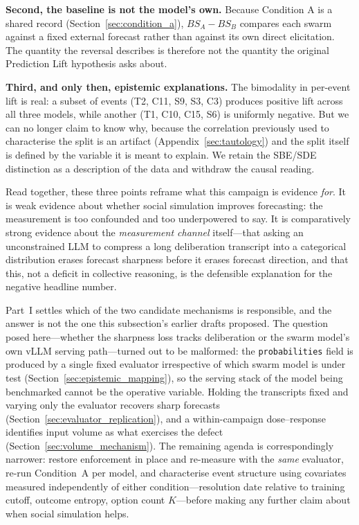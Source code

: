 \documentclass[11pt,journal,onecolumn]{IEEEtran}
\begin{document}
\textbf{Second, the baseline is not the model's own.} Because Condition A is a shared record (Section~\ref{sec:condition_a}), $BS_A - BS_B$ compares each swarm against a fixed external forecast rather than against its own direct elicitation. The quantity the reversal describes is therefore not the quantity the original Prediction Lift hypothesis asks about.

\textbf{Third, and only then, epistemic explanations.} The bimodality in per-event lift is real: a subset of events (T2, C11, S9, S3, C3) produces positive lift across all three models, while another (T1, C10, C15, S6) is uniformly negative. But we can no longer claim to know why, because the correlation previously used to characterise the split is an artifact (Appendix~\ref{sec:tautology}) and the split itself is defined by the variable it is meant to explain. We retain the SBE/SDE distinction as a description of the data and withdraw the causal reading.

Read together, these three points reframe what this campaign is evidence \emph{for}. It is weak evidence about whether social simulation improves forecasting: the measurement is too confounded and too underpowered to say. It is comparatively strong evidence about the \emph{measurement channel} itself---that asking an unconstrained LLM to compress a long deliberation transcript into a categorical distribution erases forecast sharpness before it erases forecast direction, and that this, not a deficit in collective reasoning, is the defensible explanation for the negative headline number.

Part~I settles which of the two candidate mechanisms is responsible, and the answer is not the one this subsection's earlier drafts proposed. The question posed here---whether the sharpness loss tracks deliberation or the swarm model's own vLLM serving path---turned out to be malformed: the \texttt{probabilities} field is produced by a single fixed evaluator irrespective of which swarm model is under test (Section~\ref{sec:epistemic_mapping}), so the serving stack of the model being benchmarked cannot be the operative variable. Holding the transcripts fixed and varying only the evaluator recovers sharp forecasts (Section~\ref{sec:evaluator_replication}), and a within-campaign dose--response identifies input volume as what exercises the defect (Section~\ref{sec:volume_mechanism}). The remaining agenda is correspondingly narrower: restore enforcement in place and re-measure with the \emph{same} evaluator, re-run Condition~A per model, and characterise event structure using covariates measured independently of either condition---resolution date relative to training cutoff, outcome entropy, option count $K$---before making any further claim about when social simulation helps.
\end{document}
